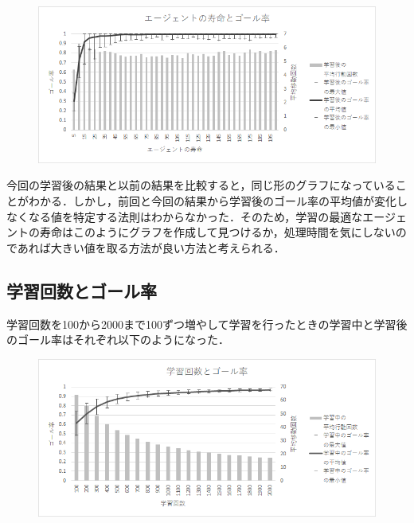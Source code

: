 \documentclass[a4j,11pt]{jarticle}
\begin{document}
\begin{figure}[ht]
  \begin{center}
    \includegraphics[scale=1.5]{img/valAgentLifetime10.png}
  \end{center}
\end{figure}

今回の学習後の結果と以前の結果を比較すると，同じ形のグラフになっていることがわかる．しかし，前回と今回の結果から学習後のゴール率の平均値が変化しなくなる値を特定する法則はわからなかった．そのため，学習の最適なエージェントの寿命はこのようにグラフを作成して見つけるか，処理時間を気にしないのであれば大きい値を取る方法が良い方法と考えられる．

\newpage

\subsection{学習回数とゴール率}

学習回数を100から2000まで100ずつ増やして学習を行ったときの学習中と学習後のゴール率はそれぞれ以下のようになった．

\begin{figure}[ht]
  \begin{center}
    \includegraphics[scale=1.5]{img/changeLearningLimit10.png}
  \end{center}
\end{figure}
\end{document}
